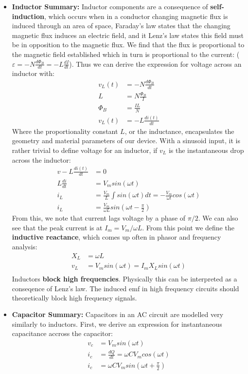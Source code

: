 \documentclass{book}
\begin{document}
\begin{itemize}
	\item \textbf{Inductor Summary:} Inductor components are a consequence of \textbf{self-induction}, which occurs when in a conductor changing magnetic flux is induced through an area of space, Faraday's law states that the changing magnetic flux induces an electric field, and it Lenz's law states this field must be in opposition to the magnetic flux. We find that the flux is proportional to the magnetic field established which in turn is proportional to the current: ($\varepsilon = -N \frac{d\Phi_B}{dt} = -L\frac{dI}{dt} $). Thus we can derive the expression for voltage across an inductor with:
	\begin{align*}
		v_L(t) &= -N \frac{d\Phi_B}{dt} \\
		L &= N \frac{\Phi_B} {I} \\
		\Phi_B &= \frac{IL}{N} \\ 
		v_L(t) &= -L \frac{di(t)}{dt}
	\end{align*}
	Where the proportionality constant $L$, or the inductance, encapsulates the geometry and material parameters of our device. With a sinusoid input, it is rather trivial to define voltage for an inductor, if $v_L$ is the instantaneous drop across the inductor:
	\begin{align*}
		v- L \frac{di(t)}{dt} &= 0 \\
		L \frac{di}{dt} &= V_m sin(\omega t)\\
		i_L &= \frac{V_m}{L} \int sin(\omega t) dt = - \frac{V_m}{\omega t} cos(\omega t)\\
		i_L &= \frac{V_m}{\omega L} sin(\omega t - \frac{\pi}{2})
	\end{align*}
	From this, we note that current lags voltage by a phase of $\pi/2$. We can also see that the peak current is at $I_m = V_m / \omega L$. From this point we define the \textbf{inductive reactance}, which comes up often in phasor and frequency analysis:
	\begin{align*}
		X_L &= \omega L \\
		v_L &= V_m sin (\omega t) = I_m X_L sin (\omega t) \\ 
	\end{align*}
	Inductors \textbf{block high frequencies}. Physically this can be interpreted as a conseqence of Lenz's law. The induced emf in high frequency circuits should theoretically block high frequency signals. 
	\item \textbf{Capacitor Summary:} Capacitors in an AC circuit are modelled very similarly to inductors. First, we derive an expression for instantaneous capacitance accross the capacitor:
	\begin{align*}
		v_c &= V_m sin(\omega t) \\
		i_c &= \frac{dQ}{dt} = \omega CV_m cos(\omega t) \\
		i_c &= \omega C V_m sin(\omega t + \frac{\pi}{2})
	\end{align*}
	

\end{itemize}
\end{document}
